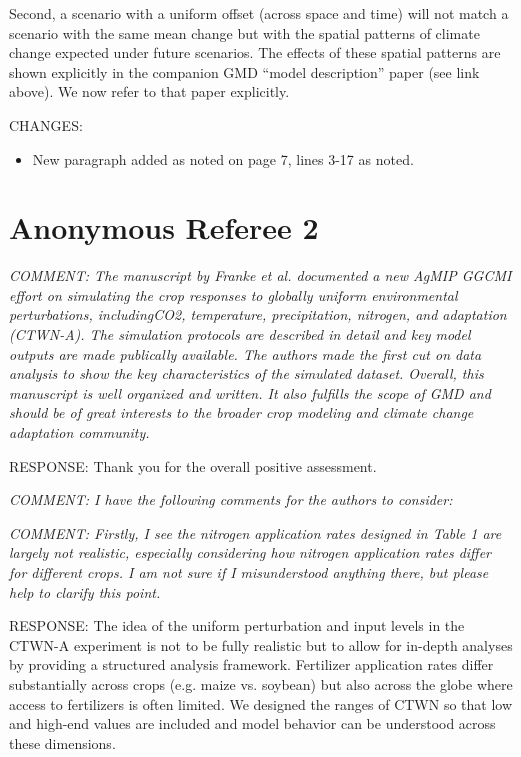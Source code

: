 \documentclass[gmd, manuscript]{copernicus} %
\begin{document}
Second, a scenario with a uniform offset (across space and time) will not match a scenario with the same mean change but with the spatial patterns of climate change expected under future scenarios. The effects of these spatial patterns are shown explicitly in the companion GMD “model description” paper (see link above). We now refer to that paper explicitly. 

CHANGES:
\begin{itemize}
    \item New paragraph added as noted on page 7, lines 3-17 as noted.
\end{itemize}

\clearpage
\section{Anonymous Referee 2}

\textcolor{dark-gray}{\textit{COMMENT: The manuscript by Franke et al. documented a new AgMIP GGCMI effort on simulating the crop responses to globally uniform environmental perturbations, includingCO2, temperature, precipitation, nitrogen, and adaptation (CTWN-A). The simulation protocols are described in detail and key model outputs are made publically available. The authors made the first cut on data analysis to show the key characteristics of the simulated dataset. Overall, this manuscript is well organized and written. It also fulfills the scope of GMD and should be of great interests to the broader crop modeling and climate change adaptation community.}} 

RESPONSE: Thank you for the overall positive assessment.
\smallskip

\textcolor{dark-gray}{\textit{COMMENT: I have the following comments for the authors to consider:}} 

\textcolor{dark-gray}{\textit{COMMENT: Firstly, I see the nitrogen application rates designed in Table 1 are largely not realistic, especially considering how nitrogen application rates differ for different crops. I am not sure if I misunderstood anything there, but please help to clarify this point.}} 

RESPONSE: The idea of the uniform perturbation and input levels in the CTWN-A experiment is not to be fully realistic but to allow for in-depth analyses by providing a structured analysis framework. Fertilizer application rates differ substantially across crops (e.g. maize vs. soybean) but also across the globe where access to fertilizers is often limited. We designed the ranges of CTWN so that low and high-end values are included and model behavior can be understood across these dimensions.
\end{document}
